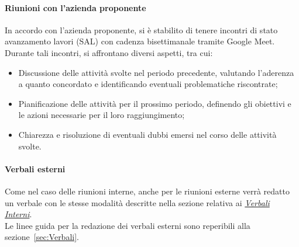 \paragraph*{Riunioni con l'azienda proponente}
In accordo con l'azienda proponente, si è stabilito di tenere incontri di stato avanzamento lavori (SAL) con cadenza bisettimanale tramite Google Meet. \\
Durante tali incontri, si affrontano diversi aspetti, tra cui:
\begin{itemize}
    \item Discussione delle attività svolte nel periodo precedente, valutando l'aderenza a quanto concordato e identificando eventuali problematiche riscontrate;
    \item Pianificazione delle attività per il prossimo periodo, definendo gli obiettivi e le azioni necessarie per il loro raggiungimento;
    \item Chiarezza e risoluzione di eventuali dubbi emersi nel corso delle attività svolte.
\end{itemize}

\paragraph*{Verbali esterni}
Come nel caso delle riunioni interne, anche per le riunioni esterne verrà redatto un verbale con le stesse modalità descritte nella sezione relativa ai \hyperlink{par:verbaliInterni}{\textit{Verbali Interni}}. \\
Le linee guida per la redazione dei verbali esterni sono reperibili alla sezione~\ref{sec:Verbali}.
